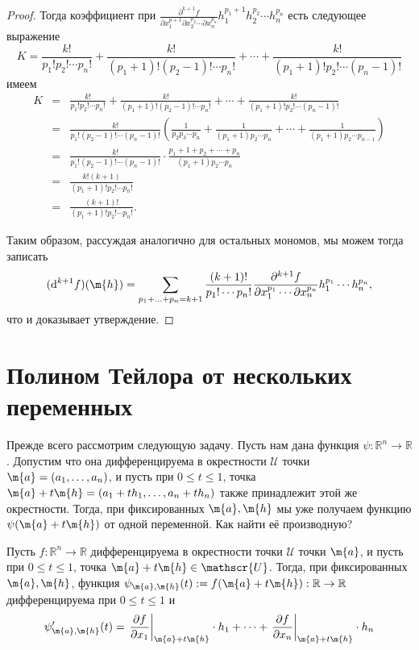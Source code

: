 \begin{proof}
Тогда коэффициент при $\frac{\partial^{k+1}f}{\partial x_1^{p+1}\partial x_2^{p_2} \cdots \partial x_n^{p_n}} h_1^{p_1+1}h_2^{p_2}\cdots h_n^{p_n}$ есть следующее выражение
\[
 K = \frac{k!}{p_1! p_2! \cdots p_n!} + \frac{k!}{(p_1+1)!(p_2-1)! \cdots p_n!} + \cdots + \frac{k!}{(p_1+1)!p_2! \cdots (p_n-1)!}
\]
имеем
\begin{eqnarray*}
  K &=&   \frac{k!}{p_1! p_2! \cdots p_n!} + \frac{k!}{(p_1+1)!(p_2-1)! \cdots p_n!} + \cdots + \frac{k!}{(p_1+1)!p_2! \cdots (p_n-1)!} \\
  &=& \frac{k!}{p_1! (p_2-1)! \cdots (p_n-1)!}\left( \frac{1}{p_2p_3 \cdots p_n} + \frac{1}{(p_1+1)p_2\cdots p_n} + \cdots + \frac{1}{(p_1+1)p_2 \cdots p_{n-1}}\right) \\
  &=& \frac{k!}{p_1! (p_2-1)! \cdots (p_n-1)!} \cdot \frac{p_1+1 +p_2+ \cdots+ p_n}{(p_1+1)p_2\cdots p_n} \\
  &=& \frac{k!(k+1)}{(p_1+1)! p_2! \cdots p_n!} \\
  &=& \frac{(k+1)!}{(p_1+1)! p_2! \cdots p_n!}.
\end{eqnarray*}

Таким образом, рассуждая аналогично для остальных мономов, мы можем тогда записать
\[
 (\mathrm{d}^{k+1}f)(\m{h}) = \sum_{p_1 + \ldots + p_n = k+1} \dfrac{(k+1)!}{p_1! \cdots p_n!} \frac{\partial^{k+1} f}{\partial x_1^{p_1} \cdots \partial x_n^{p_n}} h_1^{p_1}\cdots h_n^{p_n},
\]
что и доказывает утверждение.

\end{proof}


\section{Полином Тейлора от нескольких переменных}

Прежде всего рассмотрим следующую задачу. Пусть нам дана функция $\psi:\mathbb{R}^n \to \mathbb{R}$. Допустим что она дифференцируема в окрестности $\mathscr{U}$ точки $\m{a} = (a_1,\ldots, a_n)$, и пусть при $0\le t \le 1$, точка $\m{a}+t\m{h} = (a_1 + th_1, \ldots, a_n+th_n)$ также принадлежит этой же окрестности. Тогда, при фиксированных $\m{a}, \m{h}$ мы уже получаем функцию $\psi(\m{a}+t\m{h})$ от одной переменной. Как найти её производную?

\begin{lemma}
    Пусть $f:\mathbb{R}^n \to \mathbb{R}$ дифференцируема в окрестности точки $\mathscr{U}$ точки $\m{a}$, и пусть при $0\le t \le 1$, точка $\m{a}+t\m{h}\in \mathscr{U}$. Тогда, при фиксированных $\m{a}, \m{h}$, функция $\psi_{\m{a},\m{h}}(t):= f(\m{a}+t\m{h}):\mathbb{R} \to \mathbb{R}$ дифференцируема при $0 \le t \le 1$ и
    \[
     \psi_{\m{a},\m{h}}'(t) = \left.\frac{\partial f}{ \partial x_1}\right|_{\m{a} + t \m{h}} \cdot h_1 + \cdots + \left.\frac{\partial f}{ \partial x_n}\right|_{\m{a} + t \m{h}} \cdot h_n
    \]
\end{lemma}


